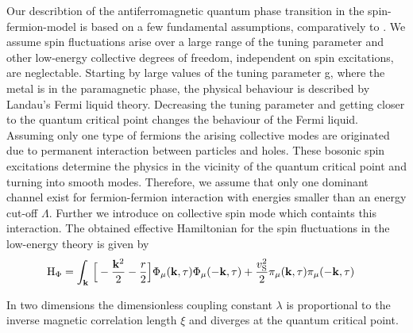 Our describtion of the antiferromagnetic quantum phase transition in the spin-fermion-model is based on a few fundamental assumptions, comparatively to \cite{Abanov&Chubukov&Schmalian}.
We assume spin fluctuations arise over a large range of the tuning parameter and other low-energy collective degrees of freedom, independent on spin excitations, are neglectable.
Starting by large values of the tuning parameter g, where the metal is in the paramagnetic phase, the physical behaviour is described by Landau's Fermi liquid theory.
Decreasing the tuning parameter and getting closer to the quantum critical point changes the behaviour of the Fermi liquid.
Assuming only one type of fermions the arising collective modes are originated due to permanent interaction between particles and holes.
These bosonic spin excitations determine the physics in the vicinity of the quantum critical point and turning into smooth modes.
Therefore, we assume that only one dominant channel exist for fermion-fermion interaction with energies smaller than an energy cut-off $\Lambda$.
Further we introduce on collective spin mode which containts this interaction.
The obtained effective Hamiltonian for the spin fluctuations in the low-energy theory is given by
%
\begin{align}
	\mt{H}_{\Phi} &= 
	 	\int_{\vb{k}}\, \Big[-\frac{\vb{k}^{2}}{2} - \frac{r}{2}\Big] \Phi_{\mu}(\vb{k},\tau) \Phi_{\mu}(-\vb{k},\tau)
		+
		\frac{v_{\mt{S}}^{2}}{2} \pi_{\mu}(\vb{k},\tau) \pi_{\mu}(-\vb{k},\tau)
	\label{eq:Hamiltonian spin fluctuation}
\end{align}
%

In two dimensions the dimensionless coupling constant $\lambda$ is proportional to the inverse magnetic correlation length $\xi$ and diverges at the quantum critical point.


















